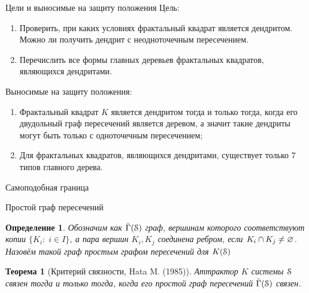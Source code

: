 \documentclass[aspectratio=1610, 10pt, notheorems]{beamer}
\newtheorem{theorem}     {Теорема}
\newtheorem{definition}  {Определение}
\begin{document}
\begin{frame}{Цели и выносимые на защиту положения}
Цель:
\begin{enumerate}
\item[$\bullet$] Проверить, при каких условиях фрактальный квадрат является дендритом. Можно ли получить дендрит с неодноточечным пересечением.
\item[$\bullet$] Перечислить все формы главных деревьев фрактальных квадратов, являющихся дендритами.
\end{enumerate}

\hfill

Выносимые на защиту положения:
\begin{enumerate}
\item[1] Фрактальный квадрат $K$ является дендритом тогда и только тогда, когда его двудольный граф пересечений является деревом, а значит такие дендриты могут быть только с одноточечным пересечением;
\item[2] Для фрактальных квадратов, являющихся дендритами, существует только $7$ типов главного дерева.
\end{enumerate}
\end{frame}

\begin{frame}{Самоподобная граница}
\end{frame}

\begin{frame}{Простой граф пересечений}
\begin{definition}
Обозначим как $\tilde{\Gamma}({\EuScript S})$ граф, вершинам которого соответствуют копии $\{K_i:\; i\in I\}$, а пара вершин $K_i,K_j$ соединена ребром, если $K_i\cap K_j\neq\varnothing$.
Назовём такой граф {\em простым графом пересечений} для $K({\EuScript S})$ 
\end{definition}

\begin{theorem}[Критерий связности, Hata M. (1985)]
Аттрактор $K$ системы ${\EuScript S}$ связен тогда и только тогда, когда его простой граф пересечений $\tilde{\Gamma}({\EuScript S})$ связен.
\end{theorem}
\end{frame}
\end{document}
